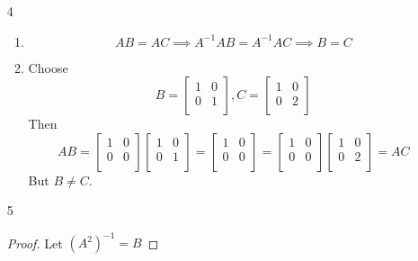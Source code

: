 \documentclass[12pt,letterpaper]{article}
\begin{document}
\begin{enumerate}
\begin{enumerate}
\begin{enumerate}
          \end{enumerate}
        \item [4]
          \begin{enumerate}
            \item
              \[
                AB = AC \implies A^{-1}AB = A^{-1}AC \implies B = C
              \]
            \item
              Choose
              \[
                B =
                \begin{bmatrix}
                  1 & 0 \\
                  0 & 1 \\
                \end{bmatrix}
                ,
                C =
                \begin{bmatrix}
                  1 & 0 \\
                  0 & 2 \\
                \end{bmatrix}
              \]
              Then
              \[
                AB =
                \begin{bmatrix}
                  1 & 0 \\
                  0 & 0 \\
                \end{bmatrix}
                \begin{bmatrix}
                  1 & 0 \\
                  0 & 1 \\
                \end{bmatrix}
                =
                \begin{bmatrix}
                  1 & 0 \\
                  0 & 0 \\
                \end{bmatrix}
                =
                \begin{bmatrix}
                  1 & 0 \\
                  0 & 0 \\
                \end{bmatrix}
                \begin{bmatrix}
                  1 & 0 \\
                  0 & 2 \\
                \end{bmatrix}
                =
                AC
              \]
               But $B \ne C$.
          \end{enumerate}
        \item [5]
          \begin{proof}
            Let $(A^2)^{-1} = B$


\end{proof}
\end{enumerate}
\end{enumerate}
\end{document}
